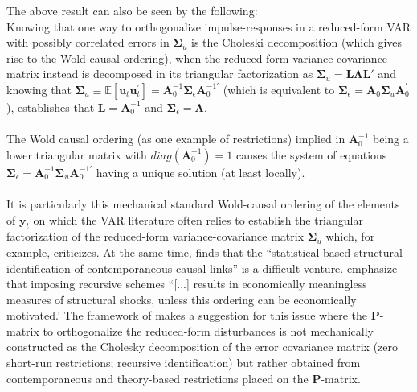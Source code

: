 \documentclass[a4paper,11pt,listof=nochaptergap,oneside,pointednumbers,bibtotoc,bigheadings,liststotoc,hidelinks]{scrbook}
\theoremstyle{mysatz}
\theoremstyle{mydefinition}
\theoremstyle{mytheorem}
\theoremstyle{mybemerkung}
\newcommand{\vect}[1]{\boldsymbol{\mathbf{#1}}}
\begin{document}
The above result can also be seen by the following:\\
Knowing that one way to orthogonalize impulse-responses in a reduced-form VAR with possibly correlated errors in $\vect{\Sigma}_u$ is the Choleski decomposition (which gives rise to the Wold causal ordering), when the reduced-form variance-covariance matrix instead is decomposed in its triangular factorization as $\vect{\Sigma}_u = \vect{L}\vect{\Lambda}\vect{L}'$ and knowing that $\vect{\Sigma}_u  \equiv \mathbb{E}[\vect{u}_t\vect{u}_t^']= \vect{A}_0^{-1}\vect{\Sigma}_\epsilon\vect{A}_0^{-1'}$ (which is equivalent to $\vect{\Sigma}_\epsilon = \vect{A}_0\vect{\Sigma}_u\vect{A}_0^'$), establishes that $\vect{L} = \vect{A}_0^{-1}$ and $\vect{\Sigma}_\epsilon = \vect{\Lambda}$. 
\\
\\
The Wold causal ordering (as one example of restrictions) implied in $\vect{A}_0^{-1}$ being a lower triangular matrix with $diag(\vect{A}_0^{-1}) = 1$ causes the system of equations $\vect{\Sigma}_\epsilon  = \vect{A}_0^{-1}\vect{\Sigma}_u\vect{A}_0^{-1'}$ having a unique solution (at least locally).
\\
\\
It is particularly this mechanical standard Wold-causal ordering of the elements of $\vect{y}_t$ on which the VAR literature often relies to establish the triangular factorization of the reduced-form variance-covariance matrix $\vect{\Sigma}_u$ which, for example, \citet{jorda:05} criticizes. At the same time, \citet[p. 4]{jorda:05} finds that the ``statistical-based structural identification of contemporaneous causal links'' is a difficult venture. \citet[p. 10]{lutkepohlkilian:17} emphasize that imposing recursive schemes ``[...] results in economically meaningless measures of structural shocks, unless this ordering can be economically motivated.' The framework of \citet{ludvigsonetal:18,ludvigsonetal:19} makes a suggestion for this issue where the $\vect{P}$-matrix to orthogonalize the reduced-form disturbances is not mechanically constructed as the Cholesky decomposition of the error covariance matrix (zero short-run restrictions; recursive identification) but rather obtained from contemporaneous and theory-based restrictions placed on the $\vect{P}$-matrix.
\end{document}

